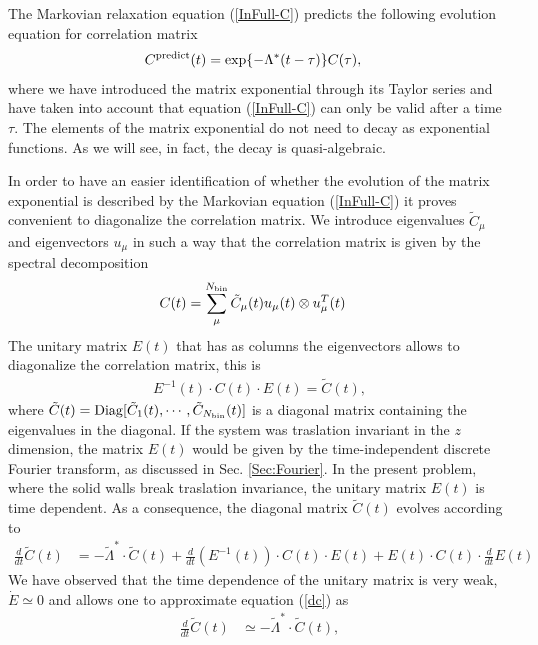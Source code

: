 \documentclass[b5paper,openright,10pt]{book}
\newcommand{\esc}{\!\cdot\!}
\begin{document}
The Markovian relaxation equation (\ref{InFull-C}) predicts the following
evolution equation for correlation matrix
\begin{align}
  C^{\rm predict}(t)&=\exp\{-\Lambda^* (t-\tau)\}C(\tau),
\label{Cpredict}
\end{align}
where we  have introduced  the matrix  exponential through  its Taylor
series and have taken into account that equation  (\ref{InFull-C}) can only
be valid after  a time $\tau$. The elements of  the matrix exponential
do not  need to  decay as  exponential functions. As  we will  see, in
fact,  the decay  is  quasi-algebraic.   

In order to have an easier  identification of whether the evolution of
the  matrix  exponential  is   described  by  the  Markovian  equation
(\ref{InFull-C}) it  proves convenient to diagonalize  the correlation
matrix.   We introduce  eigenvalues  $\tilde{C}_\mu$ and  eigenvectors
$u_\mu$ in such a way that  the correlation matrix is given by the
spectral decomposition
\begin{align}
  C(t)&=\sum_\mu^{N_{\rm bin}}\tilde{C}_\mu(t) u_\mu(t) \otimes u_\mu^T(t)
\label{spectral}
\end{align}
The unitary matrix $E(t)$ that  has as columns the eigenvectors allows
to diagonalize the correlation matrix, this is
\begin{align}
  E^{-1}(t)\esc C(t)\esc E(t)=\tilde{C}(t),
\label{diag}
\end{align}
where $\tilde{C}(t)={\rm Diag}[\tilde{C}_1(t),\cdots,\tilde{C}_{N_{\rm
    bin}}(t)]$ is a diagonal matrix  containing the eigenvalues in the
diagonal.   If  the  system  was traslation  invariant  in  the  $z$
dimension, the  matrix $E(t)$ would  be given by  the time-independent
discrete Fourier  transform, as discussed  in Sec. \ref{Sec:Fourier}.   In the
present problem, where the solid walls break traslation invariance, the
unitary  matrix  $E(t)$ is  time  dependent.   As a  consequence,  the
diagonal matrix $\tilde{C}(t)$ evolves according to
\begin{align}
\frac{d}{dt}  \tilde{C}(t)&=-\tilde{\Lambda}^*\esc \tilde{C}(t)
  +\frac{d }{dt}(E^{-1}(t)) \esc C(t)\esc E(t)
  +E(t)\esc C(t)\esc \frac{d }{dt}E(t)  
\label{dc}
\end{align}
We have  observed that the  time dependence  of the unitary  matrix is
very weak, $\dot{E}\simeq 0$ and allows one to approximate equation (\ref{dc}) as
\begin{align}
\frac{d}{dt}  \tilde{C}(t)&\simeq-\tilde{\Lambda}^*\esc \tilde{C}(t),
\label{Ctilde}
\end{align}
\end{document}
